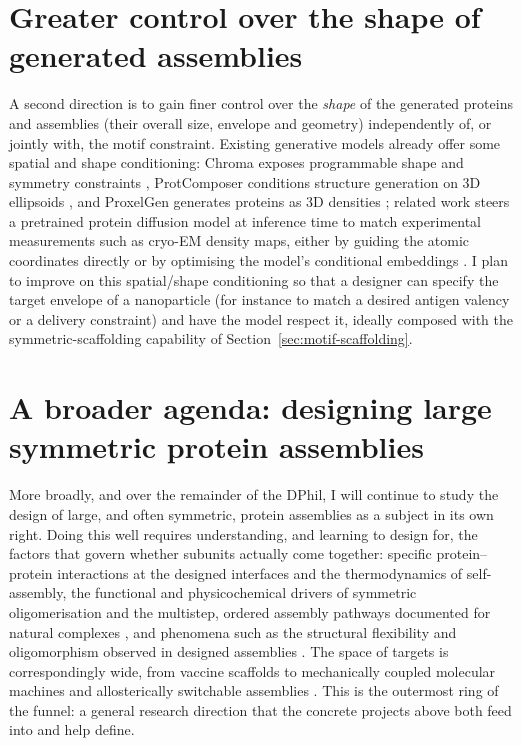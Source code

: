 \section{Greater control over the shape of generated assemblies}
\label{sec:shape-control}

A second direction is to gain finer control over the \emph{shape} of the generated
proteins and assemblies (their overall size, envelope and geometry) independently
of, or jointly with, the motif constraint. Existing generative models already offer
some spatial and shape conditioning: Chroma exposes programmable shape and
symmetry constraints \parencite{ingrahamIlluminatingProteinSpace2023}, ProtComposer
conditions structure generation on 3D ellipsoids
\parencite{stark_protcomposer_2025}, and ProxelGen generates proteins as 3D
densities \parencite{faltings_proxelgen_2025}; related work steers a pretrained
protein diffusion model at inference time to match experimental measurements such
as cryo-EM density maps, either by guiding the atomic coordinates directly
\parencite{raghu_multiscale_2025} or by optimising the model's conditional
embeddings \parencite{li_robust_2026}. I plan to improve on this spatial/shape conditioning so
that a designer can specify the target envelope of a nanoparticle (for instance to
match a desired antigen valency or a delivery constraint) and have the model
respect it, ideally composed with the symmetric-scaffolding capability of
Section~\ref{sec:motif-scaffolding}.

\section{A broader agenda: designing large symmetric protein assemblies}
\label{sec:broad-agenda}

More broadly, and over the remainder of the DPhil, I will continue to study the
design of large, and often symmetric, protein assemblies as a subject in its own
right. Doing this well requires understanding, and learning to design for, the
factors that govern whether subunits actually come together: specific
protein--protein interactions at the designed interfaces and the
thermodynamics of self-assembly, the functional and physicochemical drivers of
symmetric oligomerisation \parencite{goodsell_structural_2000} and the multistep,
ordered assembly pathways documented for natural complexes
\parencite{marsh_structure_2015}, and phenomena such as the structural
flexibility and oligomorphism observed in designed assemblies
\parencite{khmelinskaia_local_2025}.
The space of targets is correspondingly wide, from vaccine scaffolds to
mechanically coupled molecular machines \parencite{courbet_computational_2022} and
allosterically switchable assemblies \parencite{pillai_novo_2024}. This is the
outermost ring of the funnel: a general research direction that the concrete
projects above both feed into and help define.

